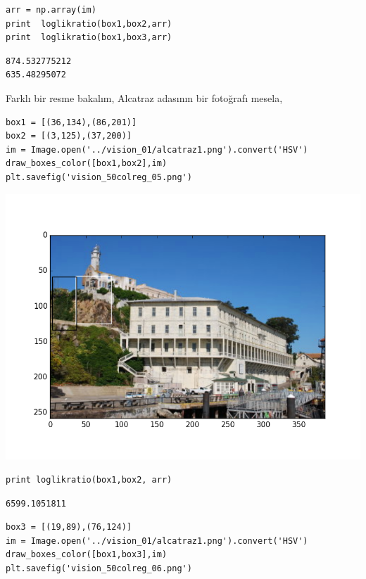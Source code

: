 \documentclass[12pt,fleqn]{article}\usepackage{../../common}
\begin{document}
\begin{verbatim}
arr = np.array(im)
print  loglikratio(box1,box2,arr) 
print  loglikratio(box1,box3,arr) 
\end{verbatim}

\begin{verbatim}
874.532775212
635.48295072
\end{verbatim}

Farklı bir resme bakalım, Alcatraz adasının bir fotoğrafı mesela,

\begin{verbatim}
box1 = [(36,134),(86,201)]
box2 = [(3,125),(37,200)]
im = Image.open('../vision_01/alcatraz1.png').convert('HSV')
draw_boxes_color([box1,box2],im)
plt.savefig('vision_50colreg_05.png')
\end{verbatim}

\includegraphics[height=10cm]{vision_50colreg_05.png}

\begin{verbatim}
print loglikratio(box1,box2, arr)
\end{verbatim}

\begin{verbatim}
6599.1051811
\end{verbatim}

\begin{verbatim}
box3 = [(19,89),(76,124)]
im = Image.open('../vision_01/alcatraz1.png').convert('HSV')
draw_boxes_color([box1,box3],im)
plt.savefig('vision_50colreg_06.png')
\end{verbatim}
\end{document}

